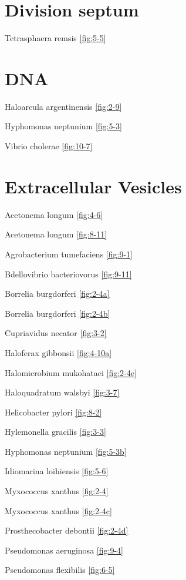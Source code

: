 \documentclass[]{tufte-book}
\begin{document}
\section*{Division septum}\label{division-septum}

Tetrasphaera remsis \ref{fig:5-5}

\section*{DNA}\label{dna}

Haloarcula argentinensis \ref{fig:2-9}

Hyphomonas neptunium \ref{fig:5-3}

Vibrio cholerae \ref{fig:10-7}

\section*{Extracellular Vesicles}\label{extracellular-vesicles}

Acetonema longum \ref{fig:4-6}

Acetonema longum \ref{fig:8-11}

Agrobacterium tumefaciens \ref{fig:9-1}

Bdellovibrio bacteriovorus \ref{fig:9-11}

Borrelia burgdorferi \ref{fig:2-4a}

Borrelia burgdorferi \ref{fig:2-4b}

Cupriavidus necator \ref{fig:3-2}

Haloferax gibbonsii \ref{fig:4-10a}

Halomicrobium mukohataei \ref{fig:2-4e}

Haloquadratum walsbyi \ref{fig:3-7}

Helicobacter pylori \ref{fig:8-2}

Hylemonella gracilis \ref{fig:3-3}

Hyphomonas neptunium \ref{fig:5-3b}

Idiomarina loihiensis \ref{fig:5-6}

Myxococcus xanthus \ref{fig:2-4}

Myxococcus xanthus \ref{fig:2-4c}

Prosthecobacter debontii \ref{fig:2-4d}

Pseudomonas aeruginosa \ref{fig:9-4}

Pseudomonas flexibilis \ref{fig:6-5}
\end{document}
